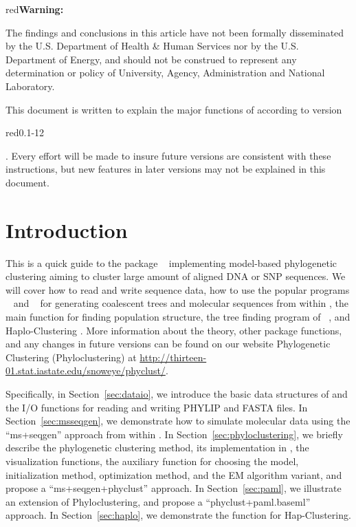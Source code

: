 
\begin{color}{red}\bf Warning:\end{color}
The findings and conclusions in this article have not been
formally disseminated by the U.S. Department of Health \& Human Services
nor by the U.S. Department of Energy,
and should not be construed to represent any determination or
policy of University, Agency, Administration and National Laboratory.

This document is written to explain the major functions of 
according to version \begin{color}{red}0.1-12\end{color}.
Every effort will be made to insure future versions are consistent with these
instructions, but new features in later versions may not be explained in this
document.


\section[Introduction]{Introduction}
\label{sec:introduction}

This is a quick guide to the package ~\citep{snoweye2011}
implementing model-based phylogenetic clustering aiming to cluster
large amount of aligned DNA or SNP sequences.
We will cover how to read and write sequence data,
how to use the popular programs ~\citep{Hudson2002} and ~\citep{Rambaut1997} for generating
coalescent trees and molecular sequences from within ,
the main function  for finding population structure,
the tree finding program  of ~\citep{Yang1997,Yang2007},
and Haplo-Clustering \citep{tzeng2005}.
More information about the theory, other package functions,
and any changes in future versions can be found on our website
Phylogenetic Clustering (Phyloclustering) at
\url{http://thirteen-01.stat.iastate.edu/snoweye/phyclust/}.

Specifically, in Section~\ref{sec:dataio}, we introduce the basic data structures
of  and the I/O functions for reading and writing 
PHYLIP and FASTA files. In Section~\ref{sec:msseqgen},
we demonstrate how to simulate molecular data using the ``ms+seqgen'' approach from within .
In Section~\ref{sec:phyloclustering}, we briefly describe
the phylogenetic clustering method, its implementation in , the visualization functions,
the auxiliary function  for choosing the model, initialization method, optimization method,
and the EM algorithm variant, and propose a ``ms+seqgen+phyclust'' approach.
In Section~\ref{sec:paml}, we illustrate an extension of Phyloclustering, and
propose a ``phyclust+paml.baseml'' approach.
In Section~\ref{sec:haplo}, we demonstrate the function
 for Hap-Clustering.



